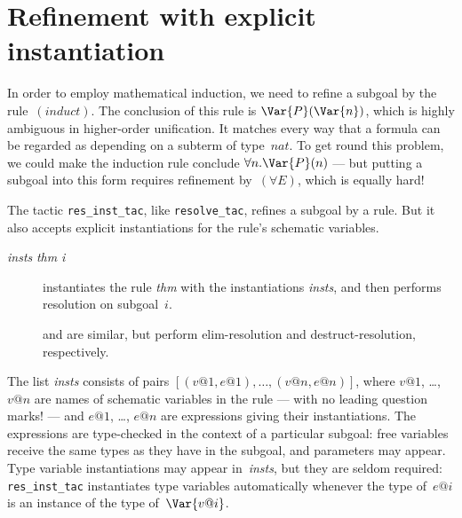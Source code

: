 \section{Refinement with explicit instantiation}

In order to employ mathematical induction, we need to refine a subgoal by
the rule~$(induct)$.  The conclusion of this rule is $\Var{P}(\Var{n})$,
which is highly ambiguous in higher-order unification.  It matches every
way that a formula can be regarded as depending on a subterm of type~$nat$.
To get round this problem, we could make the induction rule conclude
$\forall n.\Var{P}(n)$ --- but putting a subgoal into this form requires
refinement by~$(\forall E)$, which is equally hard!

The tactic {\tt res_inst_tac}, like {\tt resolve_tac}, refines a subgoal by
a rule.  But it also accepts explicit instantiations for the rule's
schematic variables.  
\begin{description}
\item[ {\it insts} {\it thm} {\it i}]
instantiates the rule {\it thm} with the instantiations {\it insts}, and
then performs resolution on subgoal~$i$.

\item[] 
and  are similar, but perform elim-resolution
and destruct-resolution, respectively.
\end{description}
The list {\it insts} consists of pairs $[(v@1,e@1), \ldots, (v@n,e@n)]$,
where $v@1$, \ldots, $v@n$ are names of schematic variables in the rule ---
with no leading question marks! --- and $e@1$, \ldots, $e@n$ are
expressions giving their instantiations.  The expressions are type-checked
in the context of a particular subgoal: free variables receive the same
types as they have in the subgoal, and parameters may appear.  Type
variable instantiations may appear in~{\it insts}, but they are seldom
required: {\tt res_inst_tac} instantiates type variables automatically
whenever the type of~$e@i$ is an instance of the type of~$\Var{v@i}$.

